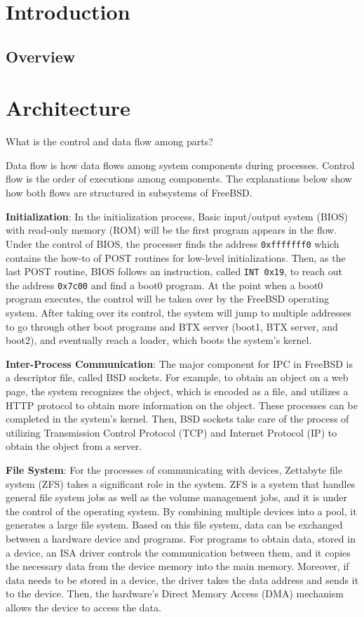 \documentclass[12pt, dvipsnames, a4paper]{article}
\newcommand{\code}[1]{\texttt{#1}}
\begin{document}
\section{Introduction}
\lipsum[1]

\subsection{Overview}
\lipsum[1]

\section{Architecture}


What is the control and data flow among parts?\par
Data flow is how data flows among system components during processes. Control flow is the order of executions among components. The explanations below show how both flows are structured in subsystems of FreeBSD.\par
\textbf{Initialization}: In the initialization process, Basic input/output system (BIOS) with read-only memory (ROM) will be the first program appears in the flow. Under the control of BIOS, the processer finds the address \code{0xfffffff0} which contains the how-to of POST routines for low-level initializations. Then, as the last POST routine, BIOS follows an instruction, called \code{INT 0x19}, to reach out the address \code{0x7c00} and find a boot0 program. At the point when a boot0 program executes, the control will be taken over by the FreeBSD operating system. After taking over its control, the system will jump to multiple addresses to go through other boot programs and BTX server (boot1, BTX server, and boot2), and eventually reach a loader, which boots the system’s kernel.\par
\textbf{Inter-Process Communication}: The major component for IPC in FreeBSD is a descriptor file, called BSD sockets. For example, to obtain an object on a web page, the system recognizes the object, which is encoded as a file, and utilizes a HTTP protocol to obtain more information on the object. These processes can be completed in the system’s kernel. Then, BSD sockets take care of the process of utilizing Transmission Control Protocol (TCP) and Internet Protocol (IP) to obtain the object from a server.\par
\textbf{File System}: For the processes of communicating with devices, Zettabyte file system (ZFS) takes a significant role in the system. ZFS is a system that handles general file system jobs as well as the volume management jobs, and it is under the control of the operating system. By combining multiple devices into a pool, it generates a large file system. Based on this file system, data can be exchanged between a hardware device and programs. For programs to obtain data, stored in a device, an ISA driver controls the communication between them, and it copies the necessary data from the device memory into the main memory. Moreover, if data needs to be stored in a device, the driver takes the data address and sends it to the device. Then, the hardware’s Direct Memory Access (DMA) mechanism allows the device to access the data.\par 
\end{document}
